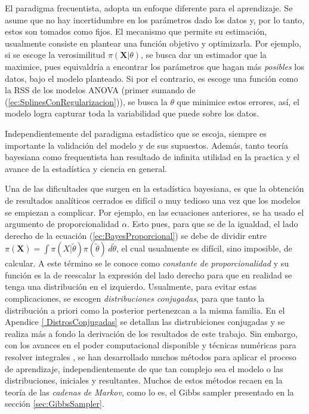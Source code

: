 \documentclass[../Main/Main.tex]{subfiles}
\begin{document}
El paradigma frecuentista, adopta un enfoque diferente para el  aprendizaje. Se asume que no hay incertidumbre en los parámetros dado los datos y, por lo tanto, estos son tomados como fijos. El mecanismo que permite su estimación, usualmente consiste en plantear una función objetivo y optimizarla. Por ejemplo, si se escoge la verosimilitud $\pi(\mathbf{X}|\theta)$, se busca dar un estimador que la maximice, pues equivaldría a encontrar los parámetros que hagan más \textit{posibles} los datos, bajo el modelo planteado. Si por el contrario, es escoge una función como la RSS de los modelos ANOVA (primer sumando de (\ref{ec:SplinesConRegularizacion})), se busca la $\theta$ que minimice estos errores, así, el modelo logra capturar toda la variabilidad que puede sobre los datos. 

Independientemente del paradigma estadístico que se escoja, siempre es importante la validación del modelo y de sus supuestos. Además, tanto teoría bayesiana como frequentista han resultado de infinita utilidad en la practica y el avance de la estadística y ciencia en general.

Una de las dificultades que surgen en la estadística bayesiana, es que la obtención de resultados analíticos cerrados es difícil o muy tedioso una vez que los modelos se empiezan a complicar. Por ejemplo, en las ecuaciones anteriores, se ha usado el argumento de proporcionalidad $\alpha$. Esto pues, para que se de la igualdad, el lado derecho de la ecuación (\ref{ec:BayesProporcional}) se debe de dividir entre $\pi(\mathbf{X}) = \int \pi(X|\tilde{\theta})\pi(\tilde{\theta})\,d\tilde{\theta}$, el cual usualmente es difícil, sino imposible, de calcular. A este término se le conoce como \textit{constante de proporcionalidad} y su función es la de reescalar la expresión del lado derecho para que en realidad se tenga una distribución en el izquierdo. Usualmente, para evitar estas complicaciones, se escogen \textit{distribuciones conjugadas}, para que tanto la distribución a priori como la posterior pertenezcan a la misma familia. En el Apendice \ref{
DistrosConjugadas} se detallan las distrubiciones conjugadas y se realiza más a fondo la derivación de los resultados de este trabajo. Sin embargo, con los avances en el poder computacional disponible y técnicas numéricas para resolver integrales \autocite{robert2004monte}, se han desarrollado muchos métodos para aplicar el proceso de aprendizaje, independientemente de que tan complejo sea el modelo o las distribuciones, iniciales y resultantes. Muchos de estos métodos recaen en la teoría de las \textit{cadenas de Markov}, como lo es, el Gibbs sampler presentado en la sección \ref{sec:GibbsSampler}. 
\end{document}
